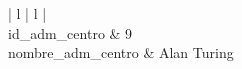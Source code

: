 \begin{description}
   \item[Ejemplo práctico]

   \item \begin{center}
            \begin{tabular}{ | l | l | }
            \hline
             \\
            \hline
            id\_adm\_centro & 9 \\
            \hline
            nombre\_adm\_centro & Alan Turing \\
            \hline
            \end{tabular}
         \end{center}
   \end{description}
